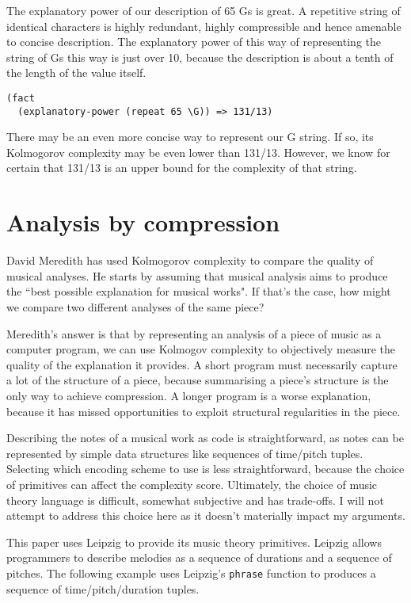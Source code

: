 \documentclass[numbers]{sigplanconf}
\begin{document}
The explanatory power of our description of 65 Gs is great. A repetitive string of identical characters is
highly redundant, highly compressible and hence amenable to concise description. The explanatory power of this way of
representing the string of Gs this way is just over 10, because the description is about a tenth of the length of the
value itself.

\begin{verbatim}
(fact
  (explanatory-power (repeat 65 \G)) => 131/13)
\end{verbatim}

There may be an even more concise way to represent our G string. If so, its Kolmogorov complexity may be even lower than
131/13. However, we know for certain that 131/13 is an upper bound for the complexity of that string.

\section{Analysis by compression}

David Meredith has used Kolmogorov complexity to compare the quality of musical analyses\cite{Analysis by Compression}.
He starts by assuming that musical analysis aims to produce the ``best possible explanation for musical works". If that's the case,
how might we compare two different analyses of the same piece?

Meredith's answer is that by representing an analysis of a piece of music as a computer program, we can use Kolmogov complexity
to objectively measure the quality of the explanation it provides. A short program must necessarily capture a lot of the structure
of a piece, because summarising a piece's structure is the only way to achieve compression. A longer program is a worse explanation,
because it has missed opportunities to exploit structural regularities in the piece.

Describing the notes of a musical work as code is straightforward, as notes can be represented by simple data structures like
sequences of time/pitch tuples. Selecting which encoding scheme to use is less straightforward, because the choice of primitives
can affect the complexity score. Ultimately, the choice of music theory language is difficult, somewhat subjective and
has trade-offs. I will not attempt to address this choice here as it doesn't materially impact my arguments.

This paper uses Leipzig to provide its music theory primitives. Leipzig allows programmers to describe melodies as a sequence
of durations and a sequence of pitches. The following example uses Leipzig's \verb|phrase| function to produces a sequence of
time/pitch/duration tuples.
\end{document}
